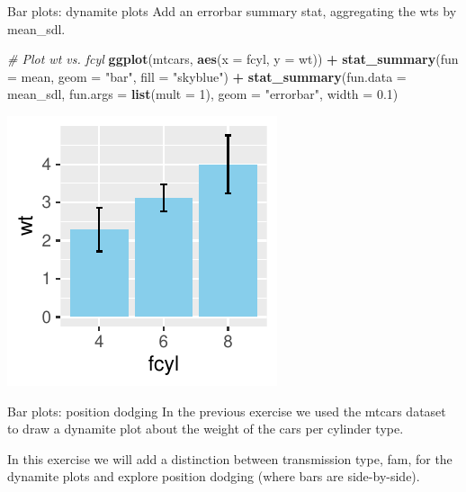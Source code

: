 \documentclass[
  ignorenonframetext,
]{beamer}
\newenvironment{Shaded}{\begin{snugshade}}{\end{snugshade}}
\newcommand{\AttributeTok}[1]{\textcolor[rgb]{0.13,0.29,0.53}{#1}}
\newcommand{\CommentTok}[1]{\textcolor[rgb]{0.56,0.35,0.01}{\textit{#1}}}
\newcommand{\DecValTok}[1]{\textcolor[rgb]{0.00,0.00,0.81}{#1}}
\newcommand{\FloatTok}[1]{\textcolor[rgb]{0.00,0.00,0.81}{#1}}
\newcommand{\FunctionTok}[1]{\textcolor[rgb]{0.13,0.29,0.53}{\textbf{#1}}}
\newcommand{\NormalTok}[1]{#1}
\newcommand{\SpecialCharTok}[1]{\textcolor[rgb]{0.81,0.36,0.00}{\textbf{#1}}}
\newcommand{\StringTok}[1]{\textcolor[rgb]{0.31,0.60,0.02}{#1}}
\begin{document}
\begin{frame}[fragile]{Bar plots: dynamite plots}
\label{bar-plots-dynamite-plots-4}
Add an errorbar summary stat, aggregating the wts by mean\_sdl.


\begin{Shaded}
\begin{Highlighting}[]
\CommentTok{\# Plot wt vs. fcyl}
\FunctionTok{ggplot}\NormalTok{(mtcars, }\FunctionTok{aes}\NormalTok{(}\AttributeTok{x =}\NormalTok{ fcyl, }\AttributeTok{y =}\NormalTok{ wt)) }\SpecialCharTok{+} \FunctionTok{stat\_summary}\NormalTok{(}\AttributeTok{fun =}\NormalTok{ mean,}
    \AttributeTok{geom =} \StringTok{"bar"}\NormalTok{, }\AttributeTok{fill =} \StringTok{"skyblue"}\NormalTok{) }\SpecialCharTok{+} \FunctionTok{stat\_summary}\NormalTok{(}\AttributeTok{fun.data =}\NormalTok{ mean\_sdl,}
    \AttributeTok{fun.args =} \FunctionTok{list}\NormalTok{(}\AttributeTok{mult =} \DecValTok{1}\NormalTok{), }\AttributeTok{geom =} \StringTok{"errorbar"}\NormalTok{, }\AttributeTok{width =} \FloatTok{0.1}\NormalTok{)}
\end{Highlighting}
\end{Shaded}

\begin{center}\includegraphics[width=0.5\linewidth]{Figs/unnamed-chunk-104-1} \end{center}
\end{frame}

\begin{frame}{Bar plots: position dodging}
\label{bar-plots-position-dodging}
In the previous exercise we used the mtcars dataset to draw a dynamite
plot about the weight of the cars per cylinder type.

In this exercise we will add a distinction between transmission type,
fam, for the dynamite plots and explore position dodging (where bars are
side-by-side).
\end{frame}
\end{document}
